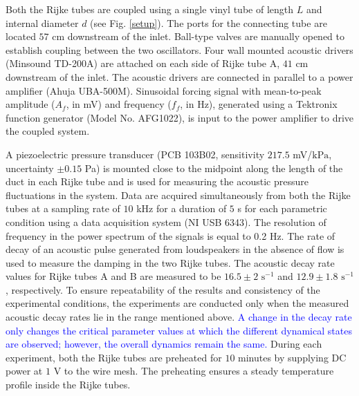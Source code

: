 \documentclass[%
preprint,
 amsmath,amssymb,
 aps,
 pra,
]{revtex4-2}
\begin{document}
Both the Rijke tubes are coupled using a single vinyl tube of length $L$ and internal diameter $d$ (see Fig. \ref{setup}). The ports for the connecting tube are located $57$ cm downstream of the inlet. Ball-type valves are manually opened to establish coupling between the two oscillators. Four wall mounted acoustic drivers (Minsound TD-200A) are attached on each side of Rijke tube A, $41$ cm downstream of the inlet. The acoustic drivers are connected in parallel to a power amplifier (Ahuja UBA-500M). Sinusoidal forcing signal with mean-to-peak amplitude ($A_f$, in mV) and frequency ($f_f$, in Hz), generated using a Tektronix function generator (Model No. AFG1022), is input to the power amplifier to drive the coupled system.

A piezoelectric pressure transducer (PCB 103B02, sensitivity $217.5$ mV/$\text{kPa}$, uncertainty $\pm 0.15$ Pa) is mounted close to the midpoint along the length of the duct in each Rijke tube and is used for measuring the acoustic pressure fluctuations in the system. Data are acquired simultaneously from both the Rijke tubes at a sampling rate of $10$ kHz for a duration of $5$ s for each parametric condition using a data acquisition system (NI USB 6343). The resolution of frequency in the power spectrum of the signals is equal to 0.2 Hz. The rate of decay of an acoustic pulse generated from loudspeakers in the absence of flow is used to measure the damping in the two Rijke tubes. The acoustic decay rate values for Rijke tubes A and B are measured to be $16.5 \pm 2$ $\text{s}^{-1}$ and $12.9 \pm 1.8$ $\text{s}^{-1}$, respectively. To ensure repeatability of the results and consistency of the experimental conditions, the experiments are conducted only when the measured acoustic decay rates lie in the range mentioned above. \textcolor{blue}{A change in the decay rate only changes the critical parameter values at which the different dynamical states are observed; however, the overall dynamics remain the same.} During each experiment, both the Rijke tubes are preheated for $10$ minutes by supplying DC power at $1$ V to the wire mesh. The preheating ensures a steady temperature profile inside the Rijke tubes.
\end{document}

